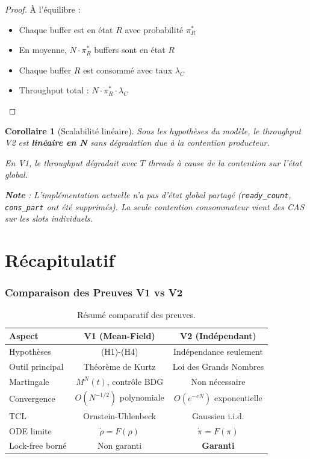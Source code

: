 \documentclass[11pt,a4paper]{article}
\theoremstyle{plain}
\newtheorem{corollary}[theorem]{Corollaire}
\theoremstyle{definition}
\theoremstyle{remark}
\begin{document}
\begin{proof}
À l'équilibre :
\begin{itemize}
    \item Chaque buffer est en état $R$ avec probabilité $\pi_R^*$
    \item En moyenne, $N \cdot \pi_R^*$ buffers sont en état $R$
    \item Chaque buffer $R$ est consommé avec taux $\lambda_C$
    \item Throughput total : $N \cdot \pi_R^* \cdot \lambda_C$
\end{itemize}
\end{proof}

\begin{corollary}[Scalabilité linéaire]
Sous les hypothèses du modèle, le throughput V2 est \textbf{linéaire en N} sans dégradation due à la contention producteur.

En V1, le throughput dégradait avec $T$ threads à cause de la contention sur l'état global.

\textbf{Note} : L'implémentation actuelle n'a pas d'état global partagé (\texttt{ready\_count}, \texttt{cons\_part} ont été supprimés). La seule contention consommateur vient des CAS sur les slots individuels.
\end{corollary}

\part{Récapitulatif}

\section{Comparaison des Preuves V1 vs V2}

\begin{table}[htbp]
\centering
\caption{Résumé comparatif des preuves.}
\small
\begin{tabular}{lcc}
\toprule
\textbf{Aspect} & \textbf{V1 (Mean-Field)} & \textbf{V2 (Indépendant)} \\
\midrule
Hypothèses & (H1)-(H4) & Indépendance seulement \\
Outil principal & Théorème de Kurtz & Loi des Grands Nombres \\
Martingale & $M^N(t)$, contrôle BDG & Non nécessaire \\
Convergence & $O(N^{-1/2})$ polynomiale & $O(e^{-cN})$ exponentielle \\
TCL & Ornstein-Uhlenbeck & Gaussien i.i.d. \\
ODE limite & $\dot{\rho} = F(\rho)$ & $\dot{\pi} = F(\pi)$ \\
Lock-free borné & Non garanti & \textbf{Garanti} \\
\bottomrule
\end{tabular}
\end{table}
\end{document}
